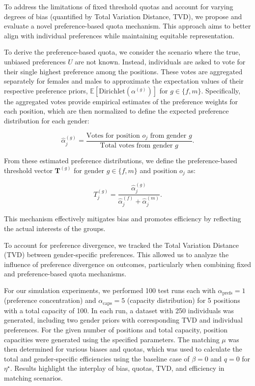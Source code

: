 \documentclass[letterpaper]{article}
\begin{document}
To address the limitations of fixed threshold quotas and account for varying degrees of bias (quantified by Total Variation Distance, TVD), we propose and evaluate a novel preference-based quota mechanism. This approach aims to better align with individual preferences while maintaining equitable representation.

To derive the preference-based quota, we consider the scenario where the true, unbiased preferences \( U \) are not known. Instead, individuals are asked to vote for their single highest preference among the positions. These votes are aggregated separately for females and males to approximate the expectation values of their respective preference priors, \( \mathbb{E}[\textrm{Dirichlet}(\alpha^{(g)})] \) for \( g \in \{f, m\} \). Specifically, the aggregated votes provide empirical estimates of the preference weights for each position, which are then normalized to define the expected preference distribution for each gender:

\[
\hat{\alpha}^{(g)}_j = \frac{\text{Votes for position } o_j \text{ from gender } g}{\text{Total votes from gender } g}.
\]

From these estimated preference distributions, we define the preference-based threshold vector \( \mathbf{T}^{(g)} \) for gender \( g \in \{f, m\} \) and position \( o_j \) as:

\[
T_j^{(g)} = \frac{\hat{\alpha}^{(g)}_j}{\hat{\alpha}^{(f)}_j + \hat{\alpha}^{(m)}_j}.
\]

This mechanism effectively mitigates bias and promotes efficiency by reflecting the actual interests of the groups.

To account for preference divergence, we tracked the Total Variation Distance (TVD) between gender-specific preferences. This allowed us to analyze the influence of preference divergence on outcomes, particularly when combining fixed and preference-based quota mechanisms.


For our simulation experiments, we performed 100 test runs each with \( \alpha_\text{prefs} = 1 \) (preference concentration) and \( \alpha_\text{caps} = 5 \) (capacity distribution) for 5 positions with a total capacity of 100. In each run, a dataset with 250 individuals was generated, including two gender priors with corresponding TVD and individual preferences. For the given number of positions and total capacity, position capacities were generated using the specified parameters. The matching \( \mu \) was then determined for various biases and quotas, which was used to calculate the total and gender-specific efficiencies using the baseline case of \( \beta = 0 \) and \( q = 0 \) for \(\eta^{\star}\). Results highlight the interplay of bias, quotas, TVD, and efficiency in matching scenarios.
\end{document}
